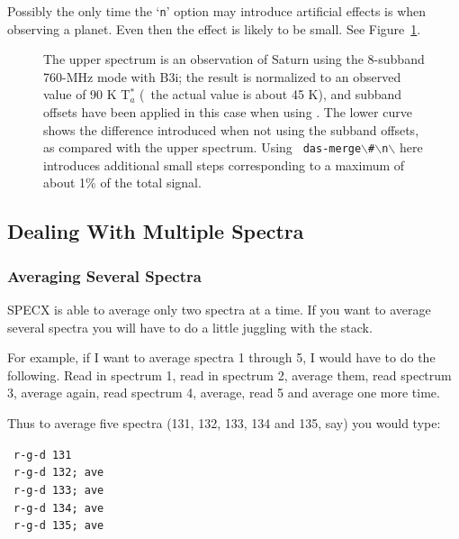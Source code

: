 Possibly the only time the `{\tt n}' option may introduce artificial
effects is when observing a planet.  Even then the effect is likely to
be small. See Figure~\ref{fig:merge_diffs}.
%
\begin{figure}[ht]
\centering
\leavevmode
\epsfxsize=4.0in
\vspace*{-0.5cm}
\begin{center}
\begin{minipage}[t]{5in}
\caption[\dm\ and planets]
{\small{The upper spectrum is an observation of Saturn using the
8-subband 760-MHz mode with B3i; the result is normalized to an
observed value of 90 K T$^*_a$ (\ie\ the actual value is about 45 K),
and subband offsets have been applied in this case when using \dm
. The lower curve shows the difference introduced when not using the
subband offsets, as compared with the upper spectrum. Using {\tt
das-merge$\backslash$\#$\backslash$n$\backslash$} here introduces
additional small steps corresponding to a maximum of about 1\% of the
total signal.}}
\label{fig:merge_diffs}
\end{minipage}
\end{center}
\end{figure}
%
%



\subsection{Dealing With Multiple Spectra}
\label{sec:specx_8}
\subsubsection{Averaging Several Spectra}
\label{sec:specx_8.2}

SPECX is able to average only two spectra at a time.  If you want to
average several spectra you will have to do a little juggling with the
stack.

For example, if I want to average spectra 1 through 5, I would have
to do the following.  Read in spectrum 1, read in spectrum 2, average
them, read spectrum 3, average again, read spectrum 4, average, read 5
and average one more time.  

Thus to average five spectra (131, 132, 133, 134 and 135, say) you
would type:

\SP\ {\tt r-g-d 131}\\
\SP\ {\tt r-g-d 132; ave}\\
\SP\ {\tt r-g-d 133; ave}\\
\SP\ {\tt r-g-d 134; ave}\\
\SP\ {\tt r-g-d 135; ave}

